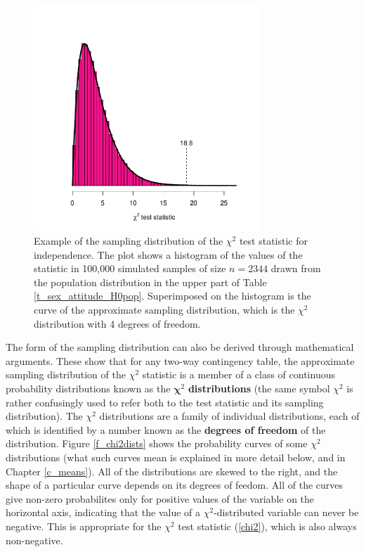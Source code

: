 \begin{figure}[t]
\caption{Example of the sampling distribution of the $\chi^{2}$ test
statistic for independence. The
plot shows a histogram of the values of the statistic in 100,000
simulated samples
of size $n=2344$ drawn from the population distribution in the upper
part of Table \ref{t_sex_attitude_H0pop}.
Superimposed on the histogram
is the curve of the approximate sampling
distribution, which is  the $\chi^{2}$ distribution with 4 degrees of
freedom.
}
\label{f_chisampld}
\begin{center}
\includegraphics[width=8.5cm]{chi2sims}
\end{center}

\end{figure}

The form of the sampling distribution can also be derived
through mathematical arguments. These show that
for any two-way contingency table, the approximate sampling distribution
of the $\chi^{2}$ statistic is a member of a class of continuous
probability distributions known as the $\boldsymbol{\chi}^{2}$
\textbf{distributions} (the same symbol $\chi^{2}$ is rather
confusingly used to refer both to the test statistic and its sampling
distribution). The $\chi^{2}$ distributions are a family of individual
distributions, each of which is identified by a number known as the
\textbf{degrees of freedom} of the distribution.
Figure \ref{f_chi2dists} shows the probability curves of some $\chi^{2}$
distributions (what such curves mean is explained in more detail below,
and in Chapter \ref{c_means}). All of the distributions are skewed to the right, and the
shape of a particular curve depends on its degrees of feedom. All of the
curves give non-zero probabilites only for positive values of the
variable on the horizontal axis, indicating that the value of a
$\chi^{2}$-distributed variable can never be negative. This is
appropriate for the $\chi^{2}$ test statistic (\ref{chi2}), which is
also always non-negative.

